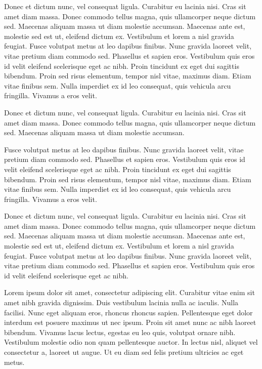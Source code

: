 Donec et dictum nunc, vel consequat ligula. Curabitur eu lacinia nisi. Cras sit amet diam massa. Donec commodo tellus magna, quis ullamcorper neque dictum sed. Maecenas aliquam massa ut diam molestie accumsan. Maecenas ante est, molestie sed est ut, eleifend dictum ex. Vestibulum et lorem a nisl gravida feugiat. Fusce volutpat metus at leo dapibus finibus. Nunc gravida laoreet velit, vitae pretium diam commodo sed. Phasellus et sapien eros. Vestibulum quis eros id velit eleifend scelerisque eget ac nibh. Proin tincidunt ex eget dui sagittis bibendum. Proin sed risus elementum, tempor nisl vitae, maximus diam. Etiam vitae finibus sem. Nulla imperdiet ex id leo consequat, quis vehicula arcu fringilla. Vivamus a eros velit.


\begin{definition}
Donec et dictum nunc, vel consequat ligula. Curabitur eu lacinia nisi. Cras sit amet diam massa. Donec commodo tellus magna, quis ullamcorper neque dictum sed. Maecenas aliquam massa ut diam molestie accumsan. 
\end{definition}

\begin{definition}
Fusce volutpat metus at leo dapibus finibus. Nunc gravida laoreet velit, vitae pretium diam commodo sed. Phasellus et sapien eros. Vestibulum quis eros id velit eleifend scelerisque eget ac nibh. Proin tincidunt ex eget dui sagittis bibendum. Proin sed risus elementum, tempor nisl vitae, maximus diam. Etiam vitae finibus sem. Nulla imperdiet ex id leo consequat, quis vehicula arcu fringilla. Vivamus a eros velit.
\end{definition}

\begin{definition}[Vestibulum]
Donec et dictum nunc, vel consequat ligula. Curabitur eu lacinia nisi. Cras sit amet diam massa. Donec commodo tellus magna, quis ullamcorper neque dictum sed. Maecenas aliquam massa ut diam molestie accumsan. Maecenas ante est, molestie sed est ut, eleifend dictum ex. Vestibulum et lorem a nisl gravida feugiat. Fusce volutpat metus at leo dapibus finibus. Nunc gravida laoreet velit, vitae pretium diam commodo sed. Phasellus et sapien eros. Vestibulum quis eros id velit eleifend scelerisque eget ac nibh.	
\end{definition}

Lorem ipsum dolor sit amet, consectetur  adipiscing elit. Curabitur vitae enim sit amet nibh gravida dignissim. Duis vestibulum lacinia nulla ac iaculis. Nulla facilisi. Nunc eget aliquam eros, rhoncus rhoncus sapien. Pellentesque eget dolor interdum est posuere maximus ut nec ipsum. Proin sit amet nunc ac nibh laoreet bibendum. Vivamus lacus lectus, egestas eu leo quis, volutpat ornare nibh. Vestibulum molestie odio non quam pellentesque auctor. In lectus nisl, aliquet vel consectetur a, laoreet ut augue. Ut eu diam sed felis pretium ultricies ac eget metus.

